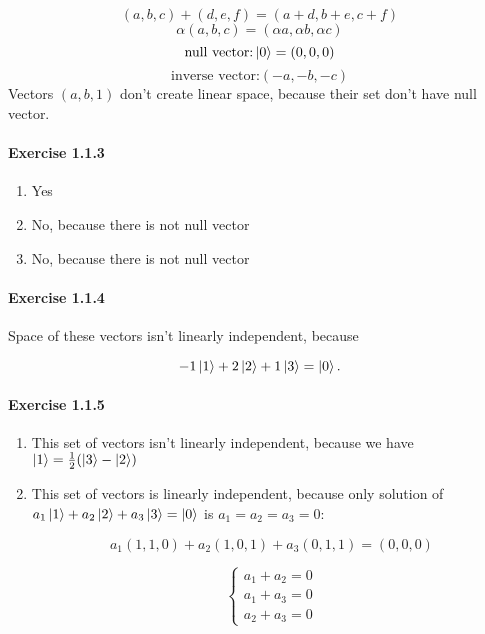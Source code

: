 \documentclass[a4paper]{article}
\begin{document}
$$
    (a, b, c) + (d, e, f) = (a + d, b + e, c + f)
$$
$$
    \alpha (a, b, c) = (\alpha a, \alpha b, \alpha c)
$$
$$
    \textrm{null vector:} \ket{0} = (0, 0, 0)
$$
$$
    \textrm{inverse vector:} (-a, -b, -c)
$$
Vectors $(a, b, 1)$ don't create linear space, because their set don't have null vector.

\paragraph{Exercise 1.1.3}

\begin{enumerate}
    \item Yes
    \item No, because there is not null vector
    \item No, because there is not null vector
\end{enumerate}

\paragraph{Exercise 1.1.4}

Space of these vectors isn't linearly independent, because

$$
    -1 \ket{1} + 2 \ket{2} + 1 \ket{3} = \ket{0}.
$$

\paragraph{Exercise 1.1.5}

\begin{enumerate}
    \item This set of vectors isn't linearly independent, because we have $\ket{1} = \frac{1}{2} (\ket{3} - \ket{2})$
    \item This set of vectors is linearly independent, because only solution of $a_{1} \ket{1} + a_{2} \ket{2} + a_{3} \ket{3} = \ket{0}$ is $a_{1} = a_{2} = a_{3} = 0$:

    $$
        a_{1} (1, 1, 0) + a_{2} (1, 0, 1) + a_{3} (0, 1, 1) = (0, 0, 0)
    $$

    $$
        \begin{cases}
            a_{1} + a_{2} = 0 \\
            a_{1} + a_{3} = 0 \\
            a_{2} + a_{3} = 0
        \end{cases}
    $$
\end{enumerate}
\end{document}
